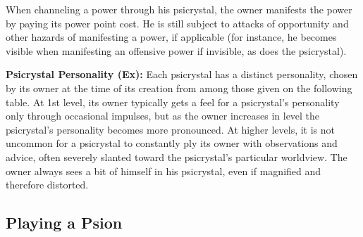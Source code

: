 When channeling a power through his psicrystal, the owner manifests the power by paying its power point cost. He is still subject to attacks of opportunity and other hazards of manifesting a power, if applicable (for instance, he becomes visible when manifesting an offensive power if invisible, as does the psicrystal).

\textbf{Psicrystal Personality (Ex):} Each psicrystal has a distinct personality, chosen by its owner at the time of its creation from among those given on the following table. At 1st level, its owner typically gets a feel for a psicrystal’s personality only through occasional impulses, but as the owner increases in level the psicrystal’s personality becomes more pronounced. At higher levels, it is not uncommon for a psicrystal to constantly ply its owner with observations and advice, often severely slanted toward the psicrystal’s particular worldview. The owner always sees a bit of himself in his psicrystal, even if magnified and therefore distorted.

\subsection{Playing a Psion}

